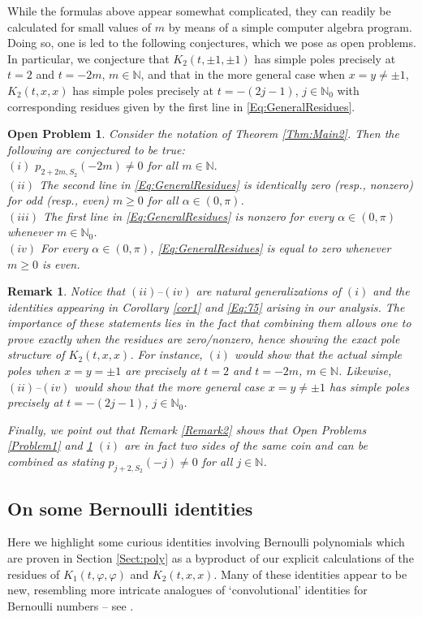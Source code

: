 \documentclass[letterpaper,10pt]{amsart}
\newtheorem{prob}[thm]{Open Problem}
\newtheorem{remark}[thm]{Remark}
\numberwithin{equation}{section}
\begin{document}
While the formulas above appear somewhat complicated, they can readily be calculated for small values of $m$ by means of a simple computer algebra program. Doing so, one is led to the following conjectures, which we pose as open problems. In particular, we conjecture that $K_2(t,\pm 1, \pm 1)$ has simple poles precisely at $t=2$ and $t=-2m$, $m\in\mathbb{N}$, and that in the more general case when $x=y\neq\pm1$, $K_2(t,x,x)$ has simple poles precisely at $t=-(2j-1)$, $j\in\mathbb{N}_0$ with corresponding residues given by the first line in \eqref{Eq:GeneralResidues}.

\begin{prob}\label{Problem2}
Consider the notation of Theorem \ref{Thm:Main2}. Then the following are conjectured to be true:\\[1mm]
$(i)$ $p_{2+2m,S_2}(-2m)\neq0$ for all $m\in\mathbb{N}.$\\[1mm]
$(ii)$ The second line in \eqref{Eq:GeneralResidues} is identically zero (resp., nonzero) for odd (resp., even) $m\geq0$ for all $\alpha\in(0,\pi)$.\\[1mm]
$(iii)$ The first line in \eqref{Eq:GeneralResidues} is nonzero for every $\alpha\in(0,\pi)$ whenever $m\in\mathbb{N}_0$.\\[1mm]
$(iv)$ For every $\alpha\in(0,\pi)$, \eqref{Eq:GeneralResidues} is equal to zero whenever $m\geq0$ is even.
\end{prob}

\begin{remark}
Notice that $(ii)$--$(iv)$ are natural generalizations of $(i)$ and the identities appearing in Corollary \ref{cor1} and \eqref{Eq:75} arising in our analysis. The importance of these statements lies in the fact that combining them allows one to prove exactly when the residues are zero/nonzero, hence showing the exact pole structure of $K_2(t,x,x)$. For instance, $(i)$ would show that the actual simple poles when $x=y=\pm1$ are precisely at $t=2$ and $t=-2m$, $m\in\mathbb{N}$.
Likewise, $(ii)$--$(iv)$ would show that the more general case $x=y\neq\pm1$ has simple poles precisely at $t=-(2j-1)$, $j\in\mathbb{N}_0$.

Finally, we point out that Remark \ref{Remark2} shows that Open Problems \ref{Problem1} and \ref{Problem2} $(i)$ are in fact two sides of the same coin and can be combined as stating $p_{j+2,S_2}(-j)\neq0$ for all $j\in\mathbb{N}$.
\end{remark}

\subsection{On some Bernoulli identities}\label{S:Bernoulli} Here we highlight some curious identities involving Bernoulli polynomials which are proven in Section \ref{Sect:poly} as a byproduct of our explicit calculations of the residues of $K_1(t,\varphi,\varphi)$ and $K_2(t,x,x)$. Many of these identities appear to be new, resembling more intricate analogues of `convolutional' identities for Bernoulli numbers -- see \cite{DS13,G05,Zag14}.
\end{document}

